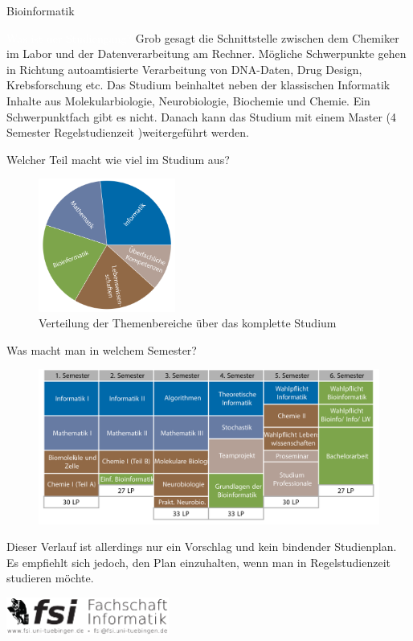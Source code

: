 	\begin{Huge}
				Bioinformatik
			\end{Huge}
			\begin{exampleblock}{\textcolor{white}{Was ist der Studiengang?}}
				Grob gesagt die Schnittstelle zwischen dem Chemiker im Labor und der Datenverarbeitung am Rechner. Mögliche Schwerpunkte gehen in Richtung autoamtisierte Verarbeitung von DNA-Daten, Drug Design, Krebsforschung etc.
				Das Studium beinhaltet neben der klassischen Informatik Inhalte aus Molekularbiologie, Neurobiologie, Biochemie und Chemie. Ein Schwerpunktfach gibt es nicht. Danach kann das Studium mit einem Master (4 Semester Regelstudienzeit )weitergeführt werden.
			\end{exampleblock}
		
			\begin{block}{Welcher Teil macht wie viel im Studium aus?}
				\begin{figure}[h!]
						\includegraphics[width=0.4\textwidth]{charts/bioinformatik-Piechart.pdf}
					\caption{Verteilung der Themenbereiche über das komplette Studium}
				\end{figure}
			\end{block}
		
		\begin{block}{Was macht man in welchem Semester?}
			\begin{figure}[h!]
					\includegraphics[width=\textwidth]{charts/bioinformatik-Studienplan_abWS18.pdf}
			\end{figure}
		Dieser Verlauf ist allerdings nur ein Vorschlag und kein bindender Studienplan. Es empfiehlt sich jedoch, den Plan einzuhalten, wenn man in Regelstudienzeit studieren möchte.
		\end{block}
	\vfill
	\begin{flushright}
		\includegraphics[width=0.4\textwidth]{fsilogo.pdf}
	\end{flushright}